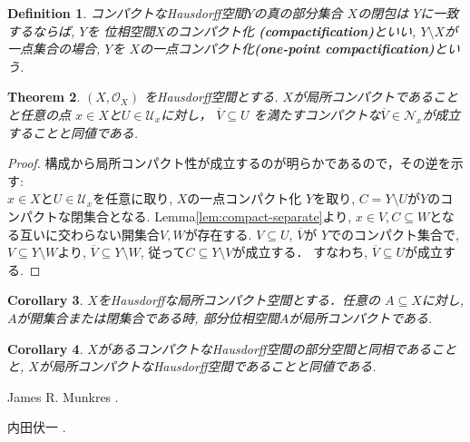 \documentclass[lualatex]{ltjsbook}
\newcommand{\cl}[1]{\overline{ #1}  }
\newtheorem{theorem}{Theorem}[section]
\newtheorem{corollary}[theorem]{Corollary}
\newtheorem{definition}[theorem]{Definition}
\theoremstyle{remark}
\theoremstyle{plain}
\begin{document}
\begin{definition}
	コンパクトなHausdorff空間$Y$の真の部分集合 $X$の閉包は $Y$に一致するならば, 
	$Y$を 位相空間$X$のコンパクト化 \textbf{(compactification)}といい, 
	$Y \setminus X$が一点集合の場合,
	$Y$を $X$の一点コンパクト化\textbf{(one-point compactification)}という.
\end{definition}



\begin{theorem}
	$\left( X , \mathcal{O}_{X} \right)$ をHausdorff空間とする. 
	$X$が局所コンパクトであることと任意の点 $x \in X$と$U \in \mathcal{U}_x$に対し，
	$\overline{V} \subseteq U$ を満たすコンパクトな$\overline{V} \in  \mathcal{N}_x$が成立することと同値である.
\end{theorem}

\begin{proof}
	構成から局所コンパクト性が成立するのが明らかであるので，その逆を示す:\\
	$x \in X$と$U \in \mathcal{U}_x$を任意に取り, $X$の一点コンパクト化 $Y$を取り, 
	$C = Y \setminus U$が$Y$のコンパクトな閉集合となる. 
	Lemma\ref{lem:compact-separate}より,
	$x \in V, C \subseteq W $となる互いに交わらない開集合$V ,W$が存在する. 
	$V \subseteq U$, $\cl{V}$が $Y$でのコンパクト集合で, 
	$V \subseteq Y \setminus W$より, 
	$\cl{V} \subseteq Y \setminus W$,
	従って$C \subseteq Y \setminus V$が成立する． 
	すなわち, $\cl{V} \subseteq U$が成立する.
\end{proof}

\begin{corollary}
	$X$をHausdorffな局所コンパクト空間とする．任意の $A \subseteq X$に対し, $A$が開集合または閉集合である時, 部分位相空間$A$が局所コンパクトである.
\end{corollary}

\begin{corollary}
	$X$があるコンパクトなHausdorff空間の部分空間と同相であることと,  $X$が局所コンパクトなHausdorff空間であることと同値である.
\end{corollary}





\begin{thebibliography}{99}
	 James R. Munkres 
	.

	 内田伏一 
	.
\end{thebibliography}
\end{document}
